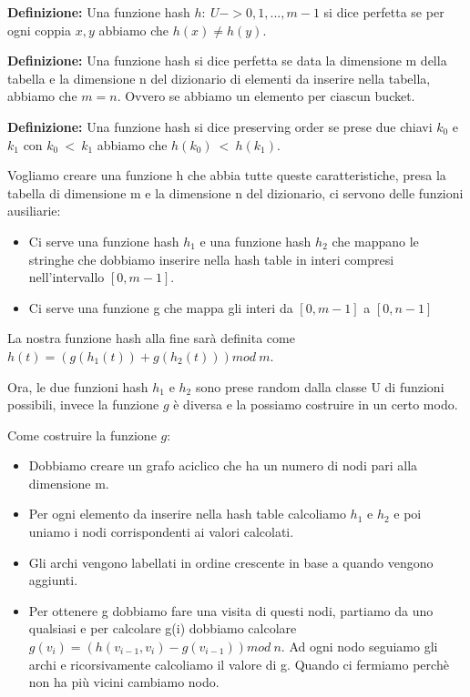 \documentclass[14pt]{extreport}
\begin{document}
\textbf{Definizione:} Una funzione hash $h:\ U->{0,1,...,m-1}$ si dice perfetta se per ogni coppia $x,y$ abbiamo che $h(x) \neq h(y)$. 

\textbf{Definizione:} Una funzione hash si dice perfetta se data la dimensione m della tabella e la dimensione n del dizionario di elementi da inserire nella tabella, abbiamo che $m=n$. Ovvero se abbiamo un elemento per ciascun bucket.

\textbf{Definizione:} Una funzione hash si dice preserving order se prese due chiavi $k_0$ e $k_1$ con $k_0\ <\ k_1$ abbiamo che $h(k_0)\ <\ h(k_1)$.

Vogliamo creare una funzione h che abbia tutte queste caratteristiche, presa la tabella di dimensione m e la dimensione n del dizionario, ci servono delle funzioni ausiliarie:
\begin{itemize}
\item Ci serve una funzione hash $h_1$ e una funzione hash $h_2$ che mappano le stringhe che dobbiamo inserire nella hash table in interi compresi nell'intervallo $[0,m-1]$.
\item Ci serve una funzione g che mappa gli interi da $[0,m-1]$ a $[0,n-1]$
\end{itemize}

La nostra funzione hash alla fine sarà definita come $h(t)=(g(h_1(t)) + g(h_2(t))) mod\ m$.

Ora, le due funzioni hash $h_1$ e $h_2$ sono prese random dalla classe U di funzioni possibili, invece la funzione $g$ è diversa e la possiamo costruire in un certo modo.

Come costruire la funzione $g$:
\begin{itemize}
\item Dobbiamo creare un grafo aciclico che ha un numero di nodi pari alla dimensione m.
\item Per ogni elemento da inserire nella hash table calcoliamo $h_1$ e $h_2$ e poi uniamo i nodi corrispondenti ai valori calcolati.
\item Gli archi vengono labellati in ordine crescente in base a quando vengono aggiunti.
\item Per ottenere g dobbiamo fare una visita di questi nodi, partiamo da uno qualsiasi e per calcolare g(i) dobbiamo calcolare $g(v_i)=(h(v_{i-1},v_i)-g(v_{i-1}))mod\ n$.
Ad ogni nodo seguiamo gli archi e ricorsivamente calcoliamo il valore di g. Quando ci fermiamo perchè non ha più vicini cambiamo nodo.
\end{itemize}
\end{document}

